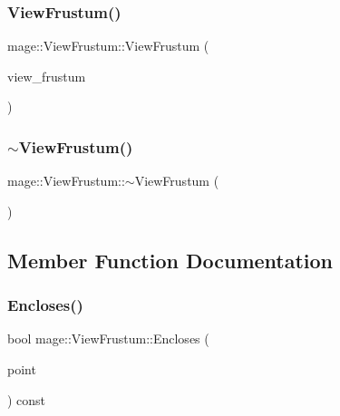 \hypertarget{classmage_1_1_view_frustum_a3568cfa6a5d440455867eb11b88a5213}{}\label{classmage_1_1_view_frustum_a3568cfa6a5d440455867eb11b88a5213} 
\subsubsection{\texorpdfstring{View\+Frustum()}{ViewFrustum()}\hspace{0.1cm}{\footnotesize\ttfamily [3/3]}}
{\footnotesize\ttfamily mage\+::\+View\+Frustum\+::\+View\+Frustum (\begin{DoxyParamCaption}\item[{\hyperlink{classmage_1_1_view_frustum}{View\+Frustum} \&\&}]{view\+\_\+frustum }\end{DoxyParamCaption})\hspace{0.3cm}{\ttfamily [default]}}

\hypertarget{classmage_1_1_view_frustum_aaa0e10f5401370909694e923c58323a9}{}\label{classmage_1_1_view_frustum_aaa0e10f5401370909694e923c58323a9} 
\subsubsection{\texorpdfstring{$\sim$\+View\+Frustum()}{~ViewFrustum()}}
{\footnotesize\ttfamily mage\+::\+View\+Frustum\+::$\sim$\+View\+Frustum (\begin{DoxyParamCaption}{ }\end{DoxyParamCaption})\hspace{0.3cm}{\ttfamily [default]}}



\subsection{Member Function Documentation}
\hypertarget{classmage_1_1_view_frustum_a290ee7b311278ed4701203859773aa42}{}\label{classmage_1_1_view_frustum_a290ee7b311278ed4701203859773aa42} 
\subsubsection{\texorpdfstring{Encloses()}{Encloses()}}
{\footnotesize\ttfamily bool mage\+::\+View\+Frustum\+::\+Encloses (\begin{DoxyParamCaption}\item[{const \hyperlink{structmage_1_1_point3}{Point3} \&}]{point }\end{DoxyParamCaption}) const}

